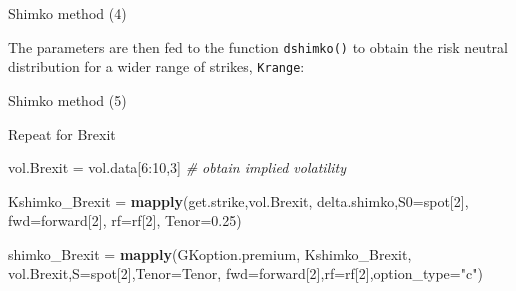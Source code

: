 \documentclass[ignorenonframetext,aspectratio=169]{beamer}
\newenvironment{Shaded}{}{}
\newcommand{\KeywordTok}[1]{\textcolor[rgb]{0.00,0.44,0.13}{\textbf{#1}}}
\newcommand{\DataTypeTok}[1]{\textcolor[rgb]{0.56,0.13,0.00}{#1}}
\newcommand{\DecValTok}[1]{\textcolor[rgb]{0.25,0.63,0.44}{#1}}
\newcommand{\FloatTok}[1]{\textcolor[rgb]{0.25,0.63,0.44}{#1}}
\newcommand{\StringTok}[1]{\textcolor[rgb]{0.25,0.44,0.63}{#1}}
\newcommand{\CommentTok}[1]{\textcolor[rgb]{0.38,0.63,0.69}{\textit{#1}}}
\newcommand{\OperatorTok}[1]{\textcolor[rgb]{0.40,0.40,0.40}{#1}}
\newcommand{\NormalTok}[1]{#1}
\begin{document}
\begin{frame}[fragile]{Shimko method (4)}

The parameters are then fed to the function \texttt{dshimko()} to obtain
the risk neutral distribution for a wider range of strikes,
\texttt{Krange}:

\begin{Shaded}
\end{Shaded}

\end{frame}

\begin{frame}[fragile]{Shimko method (5)}

Repeat for Brexit

\begin{Shaded}
\begin{Highlighting}[]
\NormalTok{vol.Brexit =}\StringTok{ }\NormalTok{vol.data[}\DecValTok{6}\OperatorTok{:}\DecValTok{10}\NormalTok{,}\DecValTok{3}\NormalTok{]         }\CommentTok{# obtain implied volatility}

\NormalTok{Kshimko_Brexit =}\StringTok{ }\KeywordTok{mapply}\NormalTok{(get.strike,vol.Brexit, }
\NormalTok{                        delta.shimko,}\DataTypeTok{S0=}\NormalTok{spot[}\DecValTok{2}\NormalTok{], }
                        \DataTypeTok{fwd=}\NormalTok{forward[}\DecValTok{2}\NormalTok{], }\DataTypeTok{rf=}\NormalTok{rf[}\DecValTok{2}\NormalTok{], }\DataTypeTok{Tenor=}\FloatTok{0.25}\NormalTok{)}

\NormalTok{shimko_Brexit =}\StringTok{ }\KeywordTok{mapply}\NormalTok{(GKoption.premium, Kshimko_Brexit, }
\NormalTok{                       vol.Brexit,}\DataTypeTok{S=}\NormalTok{spot[}\DecValTok{2}\NormalTok{],}\DataTypeTok{Tenor=}\NormalTok{Tenor,}
                       \DataTypeTok{fwd=}\NormalTok{forward[}\DecValTok{2}\NormalTok{],}\DataTypeTok{rf=}\NormalTok{rf[}\DecValTok{2}\NormalTok{],}\DataTypeTok{option_type=}\StringTok{"c"}\NormalTok{)}
\end{Highlighting}
\end{Shaded}

\end{frame}
\end{document}
